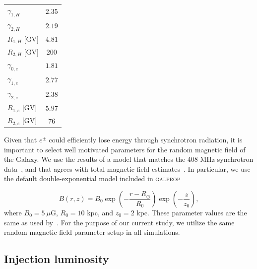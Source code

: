 \documentclass[doublespace,nopageskip]{VTthesis}
\begin{document}
\begin{table}[htb!]
\begin{tabular}{lc}
$\gamma_{1,H}$                        & $2.35$\\
$\gamma_{2,H}$                        & $2.19$\\
$R_{1,H}$ [GV]                        & $4.81$\\
$R_{2,H}$ [GV]                        & $200$\\
$\gamma_{0,e}$                        & $1.81$\\
$\gamma_{1,e}$                        & $2.77$\\
$\gamma_{2,e}$                        & $2.38$\\
$R_{1,e}$ [GV]                        & $5.97$\\
$R_{2,e}$ [GV]                        & $76$\\\hline\hline
\end{tabular}
\label{tab:galpropsetup}
\end{table}

Given that $e^{\pm}$ could efficiently lose energy through synchrotron radiation, it is important to select well motivated parameters for the random magnetic field of the Galaxy. We use the results of a model that matches the 408 MHz synchrotron data~\citep{2000ApJ...537..763S}, and that agrees with total magnetic field estimates~\citep{1995ASPC...80..507H,2001SSRv...99..243B}. In particular, we use the default double-exponential model included in \textsc{galprop} 

\begin{equation}\label{eq:Bfield}
	B(r,z) = B_0 \exp{\left(-\dfrac{r-R_\odot}{R_0}\right)}\exp{\left(-\dfrac{z}{z_0}\right)},
\end{equation}
where $B_0 = 5\ \mu$G, $R_0 = 10$ kpc, and $z_0 = 2$ kpc. These parameter values are the same as used by~\citet{2018ApJ...856...45J}. For the purpose of our current study, we utilize the same random magnetic field parameter setup in all simulations. 



\subsection{Injection luminosity}
\end{document}
